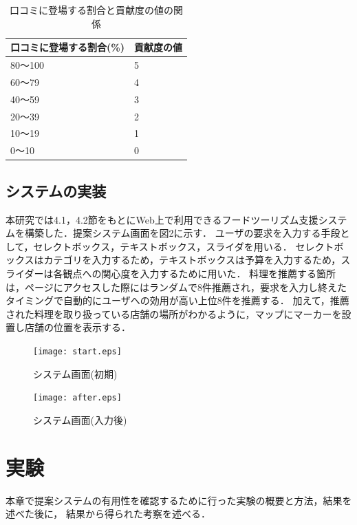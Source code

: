 \documentclass{funthesis}
\begin{document}
\begin{table}[htb]
  \begin{center}
  \scriptsize
    \caption{口コミに登場する割合と貢献度の値の関係}
    \normalsize
   \begin{tabular}{p{6cm}|p{6cm}}
    \hline
口コミに登場する割合(\%) & 貢献度の値 \\ \hline\hline
      80〜100 & 5  \\ \hline
      60〜79 & 4 \\ \hline
      40〜59 & 3 \\ \hline
      20〜39 & 2 \\ \hline
      10〜19 & 1 \\ \hline
      0〜10 & 0 \\ \hline
  \end{tabular}
  \end{center}
\end{table}

\section{システムの実装}
本研究では4.1，4.2節をもとにWeb上で利用できるフードツーリズム支援システムを構築した．提案システム画面を図2に示す．
ユーザの要求を入力する手段として，セレクトボックス，テキストボックス，スライダを用いる．
セレクトボックスはカテゴリを入力するため，テキストボックスは予算を入力するため，スライダーは各観点への関心度を入力するために用いた．
料理を推薦する箇所は，ページにアクセスした際にはランダムで8件推薦され，要求を入力し終えたタイミングで自動的にユーザへの効用が高い上位8件を推薦する．
加えて，推薦された料理を取り扱っている店舗の場所がわかるように，マップにマーカーを設置し店舗の位置を表示する．

\begin{figure}[tbp]
  \begin{center}
    \texttt{[image: start.eps]}
    \caption{システム画面(初期)}
  \end{center}
\end{figure}

\newpage

\begin{figure}[tbp]
  \begin{center}
    \texttt{[image: after.eps]}
    \caption{システム画面(入力後)}
  \end{center}
\end{figure}

\chapter{実験}
本章で提案システムの有用性を確認するために行った実験の概要と方法，結果を述べた後に，
結果から得られた考察を述べる．
\end{document}
